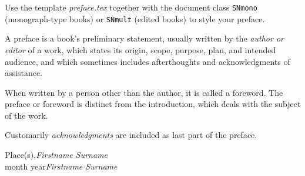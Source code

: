 %
%

\preface

Use the template \emph{preface.tex} together with the document class \verb|SNmono| (monograph-type books) or \verb|SNmult| (edited books) to style your preface.

A preface is a book's preliminary statement, usually written by the \textit{author or editor} of a work, which states its origin, scope, purpose, plan, and intended audience, and which sometimes includes afterthoughts and acknowledgments of assistance. 

When written by a person other than the author, it is called a foreword. The preface or foreword is distinct from the introduction, which deals with the subject of the work.

Customarily \textit{acknowledgments} are included as last part of the preface.
 
\vspace{\baselineskip}
\begin{flushright}\noindent
Place(s),\hfill {\it Firstname  Surname}\\
month year\hfill {\it Firstname  Surname}\\
\end{flushright}
